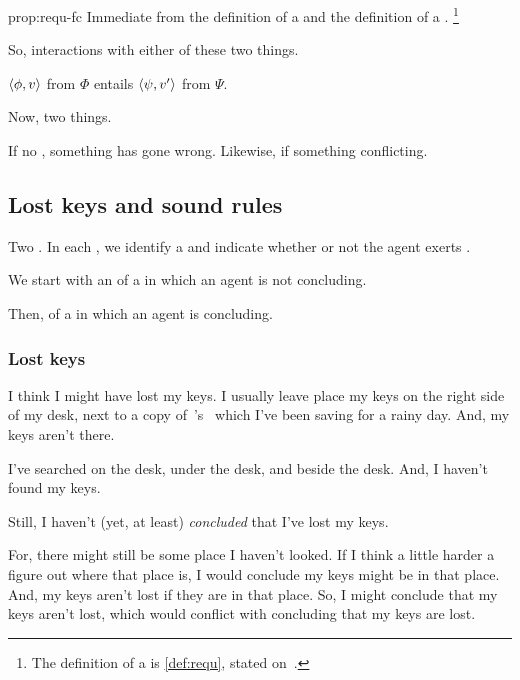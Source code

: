 \begin{note}
  \begin{argument}{prop:requ-fc}
    Immediate from the definition of a \requ{} and the definition of a \fc{}.%
    \footnote{
      The definition of a \fc{} is \autoref{def:requ}, stated on~.
    }
  \end{argument}
\end{note}

\begin{note}
  So, interactions with either of these two things.
\end{note}

\begin{note}
  \(\langle \phi, v \rangle\) from \(\Phi\) entails \(\langle \psi, v' \rangle\) from \(\Psi\).

  Now, two things.

  If no \pevent{}, something has gone wrong.
  Likewise, if something conflicting.
\end{note}

\subsection{Lost keys and sound rules}
\label{cha:requs:sec:init-illustr}

\begin{note}
  Two .
  In each , we identify a \requ{} and indicate whether or not the agent exerts \ninf{}.
\end{note}

\begin{note}
  We start with an  of a  in which an agent is not concluding.

  Then,  of a  in which an agent is concluding.
\end{note}


\subsubsection{Lost keys}


\begin{note}
  \begin{illustration}
    \label{illu:lost-key}
    I think I might have lost my keys.
    I usually leave place my keys on the right side of my desk, next to a copy of~\citeauthor{Vickers:1989tr}'s~ which I've been saving for a rainy day.
    And, my keys aren't there.

    I've searched on the desk, under the desk, and beside the desk.
    And, I haven't found my keys.

    Still, I haven't (yet, at least) \emph{concluded} that I've lost my keys.

    For, there might still be some place I haven't looked.
    If I think a little harder a figure out where that place is, I would conclude my keys might be in that place.
    And, my keys aren't lost if they are in that place.
    So, I might conclude that my keys aren't lost, which would conflict with concluding that my keys are lost.
  \end{illustration}
\end{note}

